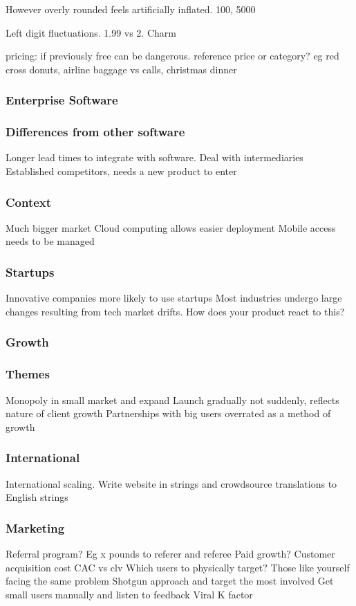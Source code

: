 However overly rounded feels artificially inflated. 100, 5000

Left digit fluctuations. 1.99 vs 2. Charm


pricing: if previously free can be dangerous. reference price or category? eg red cross donuts, airline baggage vs calls, christmas dinner

\subsubsection{Enterprise Software}
\subsubsection{Differences from other software}
Longer lead times to integrate with software.
Deal with intermediaries
Established competitors, needs a new product to enter
\subsubsection{Context}
Much bigger market
Cloud computing allows easier deployment
Mobile access needs to be managed

\subsubsection{Startups}
Innovative companies more likely to use startups
Most industries undergo large changes resulting from tech market drifts. How does your product react to this?

\subsubsection{Growth}
\subsubsection{Themes}
Monopoly in small market and expand
Launch gradually not suddenly, reflects nature of client growth
Partnerships with big users overrated as a method of growth

\subsubsection{International}
International scaling. Write website in strings and crowdsource translations to English strings

\subsubsection{Marketing}
Referral program? Eg x pounds to referer and referee
Paid growth? Customer acquisition cost CAC vs clv
Which users to physically target? Those like yourself facing the same problem
Shotgun approach and target the most involved
Get small users manually and listen to feedback
Viral K factor

